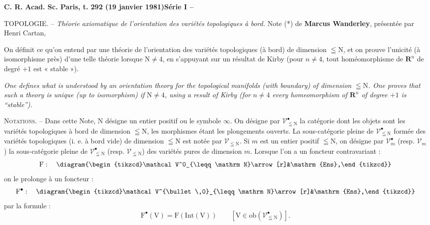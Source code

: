 \textbf{C. R. Acad. Sc. Paris, t. 292 (19 janvier 1981)}\hfill\textbf{Série I -- }

TOPOLOGIE. -- \textit{Théorie axiomatique de l'orientation des variétés topologiques à bord.}
Note (*) de \textbf{Marcus Wanderley}, présentée par Henri Cartan,

On définit ce qu'on entend par une théorie de l'orientation des variétés topologiques (à bord) de dimension $\leqq\mathrm N$, et on prouve l'unicité (à isomorphisme près) d'une telle théorie lorsque $\mathrm N\ne4$, en s'appuyant sur un résultat de Kirby (pour $n\ne4$, tout homéomorphisme de $\mathbf R^n$ de degré $+1$ est « stable »).

\textit{One defines what is understood by an orientation theory for the topological manifolds (with boundary) of dimension $\leqq\mathrm N$. One proves that such a theory is unique (up to isomorphism) if $\mathrm N\ne4$, using a result of Kirby (for $n\ne4$ every homeomorphism of $\mathbf R^n$ of degree $+1$ is ``stable'').}

\textsc{Notations}. -- Dans cette Note, $\mathrm N$ désigne un entier positif ou le symbole $\infty$. On désigne par $\mathcal V^\bullet_{\leqq\mathrm N}$ la catégorie dont les objets sont les variétés topologiques à bord de dimension $\leqq\mathrm N$, les morphismes étant les plongements ouverts. La sous-catégorie pleine de $\mathcal V^\bullet_{\leqq\mathrm N}$ formée des variétés topologiques (i. e. à bord vide) de dimension $\leqq\mathrm N$ est notée par $\mathcal V_{\leqq\mathrm N}$. Si $m$ est un entier positif $\leqq\mathrm N$, on désigne par $\mathcal V^\bullet_m$ (resp. $\mathcal V_m$) la sous-catégorie pleine de $\mathcal V^\bullet_{\leqq\mathrm N}$ (resp. $\mathcal V_{\leqq\mathrm N}$) des variétés pures de dimension $m$. Lorsque l'on a un foncteur contravariant :
\[
\mathrm F:\quad\diagram{\begin{tikzcd}\mathcal V^0_{\leqq\mathrm N}\arrow[r]&\mathrm{Ens},\end{tikzcd}}
\]
on le prolonge à un foncteur :
\[
\mathrm F^\bullet:\quad\diagram{\begin{tikzcd}\mathcal V^{\bullet\,0}_{\leqq\mathrm N}\arrow[r]&\mathrm{Ens},\end{tikzcd}}
\]
par la formule :
\[
\mathrm F^\bullet(\mathrm V)=\mathrm F(\mathrm{Int}(\mathrm V))\qquad[\mathrm V\in\mathrm{ob}(\mathcal V^\bullet_{\leqq\mathrm N})].
\]

